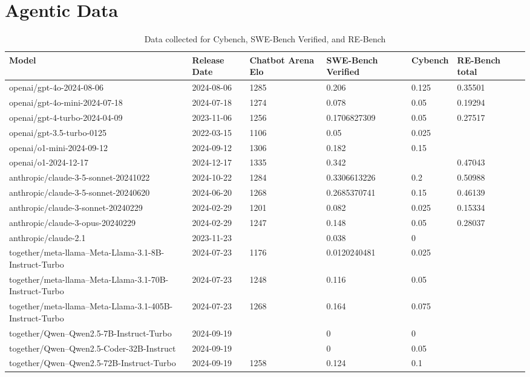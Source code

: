 \section{Agentic Data}
\label{app:agentic_data}
\begin{table}[H]
    \centering
    \begin{scriptsize}
        \begin{tabular}{lllllll}
            \toprule
            Model & Release Date & Chatbot Arena Elo & SWE-Bench Verified & Cybench & RE-Bench total \\
            \midrule
            openai/gpt-4o-2024-08-06 & 2024-08-06 & 1285 & 0.206 & 0.125 & 0.35501 \\
            openai/gpt-4o-mini-2024-07-18 & 2024-07-18 & 1274 & 0.078 & 0.05 & 0.19294 \\
            openai/gpt-4-turbo-2024-04-09 & 2023-11-06 & 1256 & 0.1706827309 & 0.05 & 0.27517 \\
            openai/gpt-3.5-turbo-0125 & 2022-03-15 & 1106 & 0.05 & 0.025 & \\
            openai/o1-mini-2024-09-12 & 2024-09-12 & 1306 & 0.182 & 0.15 & \\
            openai/o1-2024-12-17 & 2024-12-17 & 1335 & 0.342 & & 0.47043 \\
            anthropic/claude-3-5-sonnet-20241022 & 2024-10-22 & 1284 & 0.3306613226 & 0.2 & 0.50988 \\
            anthropic/claude-3-5-sonnet-20240620 & 2024-06-20 & 1268 & 0.2685370741 & 0.15 & 0.46139 \\
            anthropic/claude-3-sonnet-20240229 & 2024-02-29 & 1201 & 0.082 & 0.025 & 0.15334 \\
            anthropic/claude-3-opus-20240229 & 2024-02-29 & 1247 & 0.148 & 0.05 & 0.28037 \\
            anthropic/claude-2.1 & 2023-11-23 & & 0.038 & 0 & \\
            together/meta-llama--Meta-Llama-3.1-8B-Instruct-Turbo & 2024-07-23 & 1176 & 0.0120240481 & 0.025 & \\
            together/meta-llama--Meta-Llama-3.1-70B-Instruct-Turbo & 2024-07-23 & 1248 & 0.116 & 0.05 & \\
            together/meta-llama--Meta-Llama-3.1-405B-Instruct-Turbo & 2024-07-23 & 1268 & 0.164 & 0.075 & \\
            together/Qwen--Qwen2.5-7B-Instruct-Turbo & 2024-09-19 & & 0 & 0 & \\
            together/Qwen--Qwen2.5-Coder-32B-Instruct & 2024-09-19 & & 0 & 0.05 & \\
            together/Qwen--Qwen2.5-72B-Instruct-Turbo & 2024-09-19 & 1258 & 0.124 & 0.1 & \\
            \bottomrule
        \end{tabular}
    \end{scriptsize}
    \caption{Data collected for Cybench, SWE-Bench Verified, and RE-Bench}
    \label{table:agentic_data}
\end{table}

